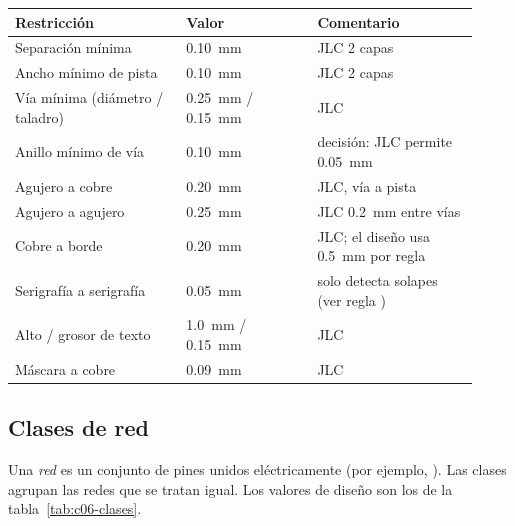 \begin{center}
\begin{tabular}{@{}L{0.34\linewidth}L{0.26\linewidth}L{0.32\linewidth}@{}}
\toprule
\textbf{Restricción} & \textbf{Valor} & \textbf{Comentario}\\
\midrule
Separación mínima & \SI{0.10}{\milli\meter} & JLC 2 capas\\
Ancho mínimo de pista & \SI{0.10}{\milli\meter} & JLC 2 capas\\
Vía mínima (diámetro / taladro) & \SI{0.25}{\milli\meter} / \SI{0.15}{\milli\meter} & JLC\\
Anillo mínimo de vía & \SI{0.10}{\milli\meter} & decisión: JLC permite \SI{0.05}{\milli\meter}\\
Agujero a cobre & \SI{0.20}{\milli\meter} & JLC, vía a pista\\
Agujero a agujero & \SI{0.25}{\milli\meter} & JLC \SI{0.2}{\milli\meter} entre vías\\
Cobre a borde & \SI{0.20}{\milli\meter} & JLC; el diseño usa \SI{0.5}{\milli\meter} por regla\\
Serigrafía a serigrafía & \SI{0.05}{\milli\meter} & solo detecta solapes (ver regla )\\
Alto / grosor de texto & \SI{1.0}{\milli\meter} / \SI{0.15}{\milli\meter} & JLC\\
Máscara a cobre & \SI{0.09}{\milli\meter} & JLC\\
\bottomrule
\end{tabular}
\end{center}

\subsection{Clases de red}
Una \emph{red} es un conjunto de pines unidos eléctricamente (por ejemplo, ). Las clases agrupan las
redes que se tratan igual. Los valores de diseño son los de la tabla~\ref{tab:c06-clases}.

